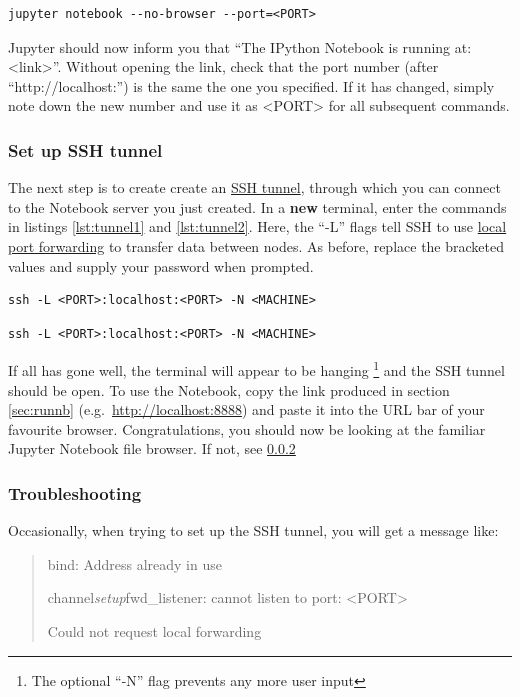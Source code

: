 \documentclass[a4paper]{article}
\begin{document}
\begin{lstlisting}[caption={Run Notebook server}, label={lst:runnb}]
jupyter notebook --no-browser --port=<PORT>
\end{lstlisting}

Jupyter should now inform you that ``The IPython Notebook is running at: \textless{}link\textgreater{}''.
Without opening the link, check that the port number (after ``http://localhost:'') is the same the one you specified.
If it has changed, simply note down the new number and use it as \textless{}PORT\textgreater{} for all subsequent commands.

\subsubsection{Set up SSH tunnel}
\label{sec:tunnel}
The next step is to create create an \href{http://blog.trackets.com/2014/05/17/ssh-tunnel-local-and-remote-port-forwarding-explained-with-examples.html}{SSH tunnel}, through which you can connect to the Notebook server you just created.
In a \textbf{new} terminal, enter the commands in listings \ref{lst:tunnel1} and \ref{lst:tunnel2}.
Here, the ``-L'' flags tell SSH to use \href{https://help.ubuntu.com/community/SSH/OpenSSH/PortForwarding}{local port forwarding} to transfer data between nodes. 
As before, replace the bracketed values and supply your password when prompted.

\begin{lstlisting}[caption={Tunnel to gateway server}, label={lst:tunnel1}]
ssh -L <PORT>:localhost:<PORT> -N <MACHINE>
\end{lstlisting}

\begin{lstlisting}[caption={Tunnel to machine}, label={lst:tunnel2}]
ssh -L <PORT>:localhost:<PORT> -N <MACHINE>
\end{lstlisting}

If all has gone well, the terminal will appear to be hanging \footnote{The optional ``-N'' flag prevents any more user input} and the SSH tunnel should be open.
To use the Notebook, copy the link produced in section \ref{sec:runnb} (e.g.~\url{http://localhost:8888}) and paste it into the URL bar of your favourite browser. 
Congratulations, you should now be looking at the familiar Jupyter Notebook file browser. If not, see \ref{sec:trouble} 

\subsubsection{Troubleshooting}
\label{sec:trouble}
Occasionally, when trying to set up the SSH tunnel, you will get a message like:
\begin{quote}
bind: Address already in use

channel\emph{setup}fwd\_listener: cannot listen to port: \textless{}PORT\textgreater{}

Could not request local forwarding
\end{quote}
\end{document}
